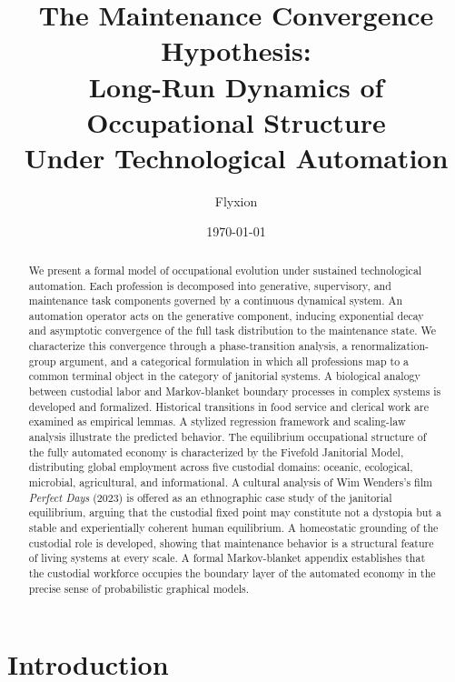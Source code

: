 \documentclass[12pt,a4paper]{article}
\title{The Maintenance Convergence Hypothesis:\\[0.4em]
\large Long-Run Dynamics of Occupational Structure\\
Under Technological Automation}
\author{Flyxion}
\date{\today}
\theoremstyle{plain}
\theoremstyle{definition}
\theoremstyle{remark}
\begin{document}
\maketitle

\begin{abstract}
We present a formal model of occupational evolution under sustained
technological automation.  Each profession is decomposed into generative,
supervisory, and maintenance task components governed by a continuous
dynamical system.  An automation operator acts on the generative component,
inducing exponential decay and asymptotic convergence of the full task
distribution to the maintenance state.  We characterize this convergence
through a phase-transition analysis, a renormalization-group argument, and a
categorical formulation in which all professions map to a common terminal
object in the category of janitorial systems.  A biological analogy between
custodial labor and Markov-blanket boundary processes in complex systems is
developed and formalized.  Historical transitions in food service and clerical
work are examined as empirical lemmas.  A stylized regression framework and
scaling-law analysis illustrate the predicted behavior.  The equilibrium
occupational structure of the fully automated economy is characterized by the
Fivefold Janitorial Model, distributing global employment across five custodial
domains: oceanic, ecological, microbial, agricultural, and informational.
A cultural analysis of Wim Wenders's film \emph{Perfect Days} (2023) is offered
as an ethnographic case study of the janitorial equilibrium, arguing that the
custodial fixed point may constitute not a dystopia but a stable and
experientially coherent human equilibrium.  A homeostatic grounding of the
custodial role is developed, showing that maintenance behavior is a
structural feature of living systems at every scale.  A formal Markov-blanket
appendix establishes that the custodial workforce occupies the boundary layer
of the automated economy in the precise sense of probabilistic graphical models.
\end{abstract}

\newpage

\tableofcontents

\newpage

\section{Introduction}
\end{document}
